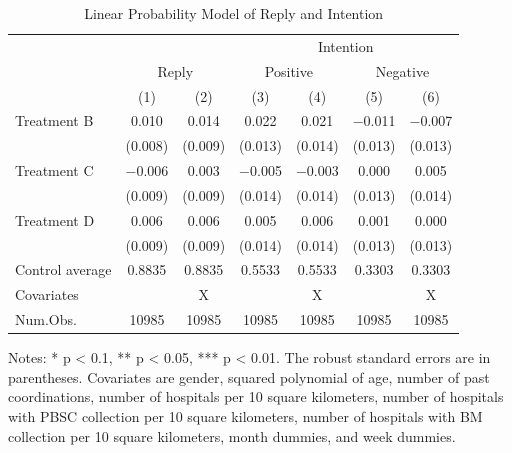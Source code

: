 \documentclass[
]{article}
\begin{document}
\begin{table}

\caption{\label{tab:reg-stock}Linear Probability Model of Reply and Intention}
\centering
\fontsize{9}{11}\selectfont
\begin{threeparttable}
\begin{tabular}[t]{lcccccc}
\toprule
\multicolumn{3}{c}{ } & \multicolumn{4}{c}{Intention} \\
\cmidrule(l{3pt}r{3pt}){4-7}
\multicolumn{1}{c}{ } & \multicolumn{2}{c}{Reply} & \multicolumn{2}{c}{Positive} & \multicolumn{2}{c}{Negative} \\
\cmidrule(l{3pt}r{3pt}){2-3} \cmidrule(l{3pt}r{3pt}){4-5} \cmidrule(l{3pt}r{3pt}){6-7}
  & (1) & (2) & (3) & (4) & (5) & (6)\\
\midrule
Treatment B & \num{0.010} & \num{0.014} & \num{0.022} & \num{0.021} & \num{-0.011} & \num{-0.007}\\
 & (\num{0.008}) & (\num{0.009}) & (\num{0.013}) & (\num{0.014}) & (\num{0.013}) & (\num{0.013})\\
Treatment C & \num{-0.006} & \num{0.003} & \num{-0.005} & \num{-0.003} & \num{0.000} & \num{0.005}\\
 & (\num{0.009}) & (\num{0.009}) & (\num{0.014}) & (\num{0.014}) & (\num{0.013}) & (\num{0.014})\\
Treatment D & \num{0.006} & \num{0.006} & \num{0.005} & \num{0.006} & \num{0.001} & \num{0.000}\\
 & (\num{0.009}) & (\num{0.009}) & (\num{0.014}) & (\num{0.014}) & (\num{0.013}) & (\num{0.013})\\
\midrule
Control average & 0.8835 & 0.8835 & 0.5533 & 0.5533 & 0.3303 & 0.3303\\
Covariates &  & X &  & X &  & X\\
Num.Obs. & \num{10985} & \num{10985} & \num{10985} & \num{10985} & \num{10985} & \num{10985}\\
\bottomrule
\end{tabular}
\begin{tablenotes}
\item Notes: * p < 0.1, ** p < 0.05, *** p < 0.01. The robust standard errors are in parentheses. Covariates are gender, squared polynomial of age, number of past coordinations, number of hospitals per 10 square kilometers, number of hospitals with PBSC collection per 10 square kilometers, number of hospitals with BM collection per 10 square kilometers, month dummies, and week dummies.
\end{tablenotes}
\end{threeparttable}
\end{table}
\end{document}
